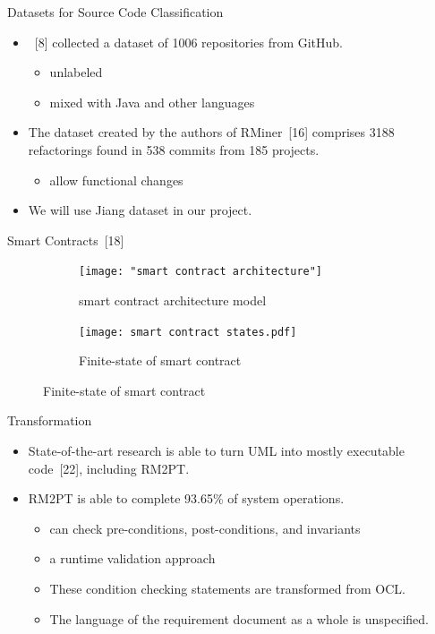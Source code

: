 \documentclass[xcolor=svgnames]{beamer}
\begin{document}
\begin{frame}{Datasets for Source Code Classification}
\begin{itemize}
\item {}~[8] collected a dataset of \num{1006} repositories from GitHub.
\begin{itemize}
\item unlabeled
\item mixed with Java and other languages
\end{itemize}

\item The dataset created by the authors of RMiner~[16] comprises \num{3188} refactorings found in 538 commits from 185 projects.
\begin{itemize}
\item allow functional changes
\end{itemize}

\item We will use Jiang dataset in our project.
\end{itemize}

\end{frame}



\begin{frame}{Smart Contracts~[18]}

\begin{figure}
\centering
\begin{subfigure}[T]{0.3\textwidth}
	\texttt{[image: "smart contract architecture"]}
	\caption{smart contract architecture model}
\end{subfigure}
\hfill
\begin{subfigure}[T]{0.65\textwidth}
	\texttt{[image: smart contract states.pdf]}
	\caption{Finite-state of smart contract}
\end{subfigure}
\end{figure}
\end{frame}


\begin{frame}{Transformation}

\begin{itemize}
\item State-of-the-art research is able to turn UML into mostly executable code~[22], including RM2PT.
\item RM2PT is able to complete 93.65\% of system operations.
\begin{itemize}
\item can check pre-conditions, post-conditions, and invariants
\item a runtime validation approach
\item<2-> These condition checking statements are transformed from OCL.
\item<3-> The language of the requirement document as a whole is unspecified.
\end{itemize}

\end{itemize}

\end{frame}
\end{document}
